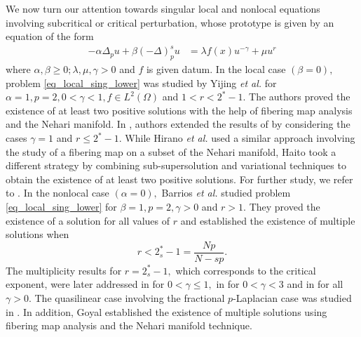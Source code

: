 \documentclass[11pt]{article}
\newcommand{\al} {\alpha}
\newcommand{\ga} {\gamma}
\newcommand{\om} {\Omega}
\newcommand{\De} {\Delta}
\newcommand{\la} {\lambda}
\newcommand{\lb}{\left(}
\newcommand{\rb}{\right)}
\begin{document}
 
  
 We now turn our attention towards singular local 
 and nonlocal equations involving subcritical or 
 critical perturbation, whose prototype is 
given by an equation of the form
 \begin{equation}\label{eq_local_sing_lower}
	\begin{aligned}
		-\alpha\De_{p}u+\beta\lb -\De\rb^s_{p}u 
&=\lambda f(x) u^{-\gamma}+ \mu u^{r}
	\end{aligned}
\end{equation}
where
$\alpha,\beta\ge0;\la,\mu,\ga>0$
and
$f$
is given datum.
In the local case
$(\beta=0),$
problem \eqref{eq_local_sing_lower} 
was studied by Yijing \textit{et al.}
\cite{sun2001} for
$\al=1,p=2, 0<\ga<1,f\in L^2(\om)$
and
$1<r<2^*-1.$
The authors proved the existence of at least 
two positive solutions with the help of 
fibering map analysis and the Nehari manifold.
In
\cite{Haito,hirano_2004}, 
authors extended the results of
\cite{sun2001} by considering the cases
$\ga=1$
and
$r\le2^*-1.$
While Hirano \textit{et al.}
\cite{hirano_2004} used a similar 
approach involving the study of a fibering 
map on a subset of the Nehari manifold, Haito
\cite{Haito} took a different strategy by 
combining sub-supersolution and variational 
techniques to obtain the existence of at 
least two positive solutions.
For further study, we refer to
\cite{arcoya2014,Bal_singular_pertub,Jacques_local_pertub, hirano2008}.
In the nonlocal case
$(\alpha=0),$
Barrios \textit{et al.}
\cite{Barrios_2015} studied problem 
\eqref{eq_local_sing_lower} for 
$\beta=1,p=2, \ga>0$
and
$r>1.$
They proved the existence of a 
solution for all values of
$r$
and established the existence of 
multiple solutions when
$$
r<2_s^*-1=
\frac{Np}{N-sp}.
$$
The multiplicity results for
$r=2_s^*-1,$
which corresponds to the critical exponent, 
were later addressed in
\cite{Mukherjee_2016} for
$0<\ga\le 1,$
in
\cite{Mukherjee_2019} for
$0<\ga<3$
and in
\cite{Mukherjee_2017} for all
$\ga>0.$
The quasilinear case involving the fractional
$p$-Laplacian case was studied in
\cite{Mukherjee_nlocal_p}.
In addition, Goyal
\cite{Goyal_1} established the existence of 
multiple solutions using fibering map 
analysis and the Nehari manifold technique.
\end{document}
